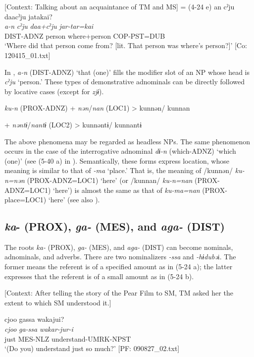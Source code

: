 \ea \label{ex:5:22}   [Context: Talking about an acquaintance of TM and MS] = (4-24 e)
\glll  an  cˀju  daacˀju  jatakai?\\
\textit{a-n}  \textit{cˀju}  \textit{daa+cˀju}  \textit{jar-tar=kai}\\
DIST-ADNZ  person  where+person  COP-PST=DUB\\
\glt ‘Where did that person come from? [lit. That person was where’s person?]’ [Co: 120415\_01.txt]
\z

In , \textit{a-n} (DIST-ADNZ) ‘that (one)’ fills the modifier slot of an NP whose head is \textit{cˀju} ‘person.’ These types of demonstrative adnominals can be directly followed by locative cases (except for \textit{zjɨ}).

\ea \label{ex:5:23}   \textit{ku-n}  (PROX-ADNZ)  +  \textit{nən}/\textit{nan}  (LOC1)  >  kunnən/ kunnan

      +  \textit{nəntɨ}/\textit{nantɨ}  (LOC2)  >  kunnəntɨ/ kunnantɨ
\z

The above phenomena may be regarded as headless NPs. The same phenomenon occurs in the case of the interrogative adnominal \textit{dɨ-n} (which-ADNZ) ‘which (one)’ (see (5-40 a) in ). Semantically, these forms express location, whose meaning is similar to that of \textit{{}-ma} ‘place.’ That is, the meaning of /kunnən/ \textit{ku-n=nən} (PROX-ADNZ=LOC1) ‘here’ (or /kunnan/ \textit{ku-n=nan} (PROX-ADNZ=LOC1) ‘here’) is almost the same as that of \textit{ku-ma=nan} (PROX-place=LOC1) ‘here’ (see also ).

\subsection{\textit{ka}{}- (PROX), \textit{ga-} (MES), and \textit{aga-} (DIST)}

The roots \textit{ka-} (PROX), \textit{ga-} (MES), and \textit{aga-} (DIST) can become nominals, adnominals, and adverbs. There are two nominalizers \textit{{}-ssa} and \textit{{}-hɨdubə}i. The former means the referent is of a specified amount as in (5-24 a); the latter expresses that the referent is of a small amount as in (5-24 b).

\ea \label{ex:5:24}  \ea \label{ex:5:24a} [Context: After telling the story of the Pear Film to SM, TM asked her the extent to which SM understood it.]

\glll  cjoo  gassa  wakajui?\\
\textit{cjoo}  \textit{ga-ssa}  \textit{wakar-jur-i}\\
just  MES-NLZ  understand-UMRK-NPST\\
\glt ‘(Do you) understand just so much?’ [PF: 090827\_02.txt]

